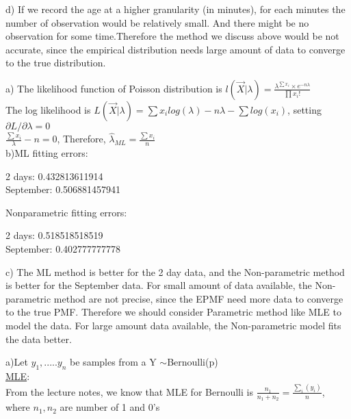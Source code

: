 \documentclass[11pt]{article}
\newenvironment{problem}[2][Problem]{\begin{trivlist}
\item[\hskip \labelsep {\bfseries #1}\hskip \labelsep {\bfseries #2.}]}{\end{trivlist}}
\begin{document}
d) If we record the age at a higher granularity (in minutes), for each minutes the number of observation would be relatively small. And there might be no observation for some time.Therefore the method we discuss above would be not accurate, since the empirical distribution needs large amount of data to converge to the true distribution.   



\begin{problem}{4}
\end{problem} 
a) The likelihood function of Poisson distribution is $l(\vec{X}|\lambda) = \frac{\lambda^{\sum x_i }\times e^{-n\lambda}}{\prod x_i!}$\\
The log likelihood is $L(\vec{X}|\lambda)  = \sum x_i log(\lambda) - n\lambda - \sum log(x_i)$, setting $\partial L/\partial \lambda = 0$\\
$\frac{\sum x_i}{\lambda} - n = 0$, Therefore, $\hat{\lambda}_{ML} = \frac{\sum x_i}{n}$\\

b)ML fitting errors:

\begin{centering}
	2 days: 0.432813611914\\
	September: 0.506881457941\\
\end{centering}

Nonparametric fitting errors:

\begin{centering}
2 days: 0.518518518519\\
September: 0.402777777778\\

\end{centering}

\hspace{0.1in}

c) The ML method is better for the 2 day data, and the Non-parametric method is better for the September data. For small amount of data available, the Non-parametric method are not precise, since the EPMF need more data to converge to the true PMF. Therefore we should consider Parametric method like MLE to model the data. For large amount data available, the Non-parametric model fits the data better.\\

\pagebreak
\begin{problem}{5}
\end{problem} 
a)Let $y_1,.....y_n$ be samples from a Y $\sim $Bernoulli(p)\\
\underline{MLE}:\\
From the lecture notes, we know that MLE for Bernoulli is $\frac{n_1}{n_1+n_2} = \frac{\sum_i(y_i)}{n}$, where $n_1,n_2$ are number of 1 and 0's\\
\end{document}
